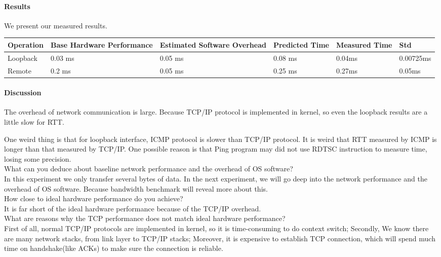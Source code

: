 \paragraph{Results}
We present our measured results.

\begin{center}
\begin{tabular}{| p{2cm} | p{3cm} | p{3cm} | p{2cm} | p{2cm} | p{2cm}}
Operation   & Base Hardware Performance  & Estimated Software Overhead  & Predicted Time  & Measured Time  & Std \\
\hline
Loopback  & 0.03 ms& 0.05 ms& 0.08 ms & 0.04ms & 0.00725ms \\
Remote  & 0.2 ms& 0.05 ms & 0.25 ms & 0.27ms & 0.05ms \\ 
\end{tabular}
\end{center}

\paragraph{Discussion}
The overhead of network communication is large. Because TCP/IP protocol is implemented in kernel, so even the loopback results are a little slow for RTT. 

One weird thing is that for loopback interface, ICMP protocol is slower than TCP/IP protocol. It is weird that RTT measured by ICMP is longer than that measured by TCP/IP. One possible reason is that Ping program may did not use RDTSC instruction to measure time, losing some precision. \\

What can you deduce about baseline network performance and the overhead of OS software?  \\
In this experiment we only transfer several bytes of data. In the next experiment, we will go deep into the network performance and the overhead of OS software. Because bandwidth benchmark will reveal more about this. \\

How close to ideal hardware performance do you achieve? \\
It is far short of the ideal hardware performance because of the TCP/IP overhead.\\


What are reasons why the TCP performance does not match ideal hardware performance?  \\
First of all, normal TCP/IP protocols are implemented in kernel, so it is time-consuming to do context switch;
Secondly, We know there are many network stacks, from link layer to TCP/IP stacks;
Moreover, it is expensive to establish TCP connection, which will spend much time on handshake(like ACKs) to make sure the connection is reliable.

